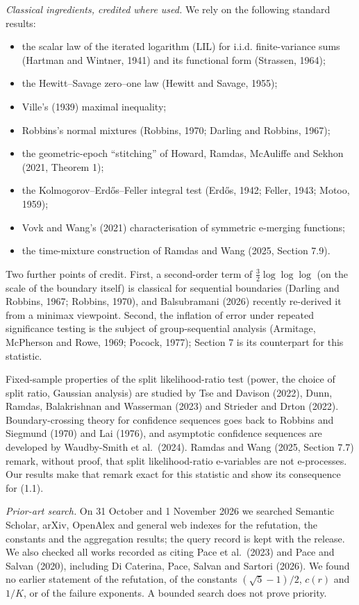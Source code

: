 \documentclass[
  10pt,
  a4paper,
]{article}
\providecommand{\tightlist}{%
  \setlength{\itemsep}{0pt}\setlength{\parskip}{0pt}}
\begin{document}
\emph{Classical ingredients, credited where used.} We rely on the
following standard results:

\begin{itemize}
\tightlist
\item
  the scalar law of the iterated logarithm (LIL) for i.i.d.
  finite-variance sums (Hartman and Wintner, 1941) and its functional
  form (Strassen, 1964);
\item
  the Hewitt--Savage zero--one law (Hewitt and Savage, 1955);
\item
  Ville's (1939) maximal inequality;
\item
  Robbins's normal mixtures (Robbins, 1970; Darling and Robbins, 1967);
\item
  the geometric-epoch ``stitching'' of Howard, Ramdas, McAuliffe and
  Sekhon (2021, Theorem 1);
\item
  the Kolmogorov--Erdős--Feller integral test (Erdős, 1942; Feller,
  1943; Motoo, 1959);
\item
  Vovk and Wang's (2021) characterisation of symmetric e-merging
  functions;
\item
  the time-mixture construction of Ramdas and Wang (2025, Section 7.9).
\end{itemize}

Two further points of credit. First, a second-order term of
\(\tfrac32\log\log\log\) (on the scale of the boundary itself) is
classical for sequential boundaries (Darling and Robbins, 1967; Robbins,
1970), and Balsubramani (2026) recently re-derived it from a minimax
viewpoint. Second, the inflation of error under repeated significance
testing is the subject of group-sequential analysis (Armitage, McPherson
and Rowe, 1969; Pocock, 1977); Section 7 is its counterpart for this
statistic.

Fixed-sample properties of the split likelihood-ratio test (power, the
choice of split ratio, Gaussian analysis) are studied by Tse and Davison
(2022), Dunn, Ramdas, Balakrishnan and Wasserman (2023) and Strieder and
Drton (2022). Boundary-crossing theory for confidence sequences goes
back to Robbins and Siegmund (1970) and Lai (1976), and asymptotic
confidence sequences are developed by Waudby-Smith et al.~(2024). Ramdas
and Wang (2025, Section 7.7) remark, without proof, that split
likelihood-ratio e-variables are not e-processes. Our results make that
remark exact for this statistic and show its consequence for (1.1).

\emph{Prior-art search.} On 31 October and 1 November 2026 we searched
Semantic Scholar, arXiv, OpenAlex and general web indexes for the
refutation, the constants and the aggregation results; the query record
is kept with the release. We also checked all works recorded as citing
Pace et al.~(2023) and Pace and Salvan (2020), including Di Caterina,
Pace, Salvan and Sartori (2026). We found no earlier statement of the
refutation, of the constants \((\sqrt5-1)/2\), \(c(r)\) and \(1/K\), or
of the failure exponents. A bounded search does not prove priority.
\end{document}
